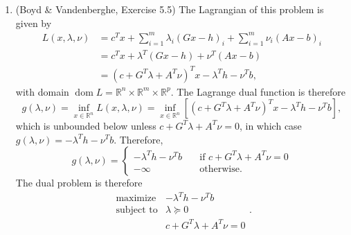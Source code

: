 \documentclass[letterpaper,12pt]{article}
\DeclareMathOperator{\dom}{dom}
\begin{document}
\begin{enumerate}
\item (Boyd \& Vandenberghe, Exercise 5.5) The Lagrangian of this
  problem is given by
  \begin{align*}
    L(x, \lambda, \nu)
      &= c^T x + \sum_{i=1}^m \lambda_i (Gx - h)_i
        + \sum_{i=1}^m \nu_i (Ax - b)_i \\
      &= c^T x + \lambda^T (Gx - h) + \nu^T (Ax - b) \\
      &= (c + G^T \lambda + A^T \nu)^T x - \lambda^T h - \nu^T b,
  \end{align*}
  with domain
  $\dom L = \mathbb{R}^n \times \mathbb{R}^m \times \mathbb{R}^p$. The
  Lagrange dual function is therefore
  \begin{equation*}
    g(\lambda, \nu) = \inf_{x \in \mathbb{R}^n} L(x, \lambda, \nu)
      = \inf_{x \in \mathbb{R}^n}
        \left[ (c + G^T \lambda + A^T \nu)^T x - \lambda^T h - \nu^T b \right],
  \end{equation*}
  which is unbounded below unless $c + G^T \lambda + A^T \nu = 0$, in
  which case $g(\lambda, \nu) = -\lambda^T h - \nu^T b$. Therefore,
  \begin{equation*}
    g(\lambda, \nu) = \begin{cases}
      -\lambda^T h - \nu^T b &\quad \text{if $c + G^T \lambda + A^T \nu = 0$} \\
      -\infty &\quad \text{otherwise}.
    \end{cases}
  \end{equation*}
  The dual problem is therefore
  \begin{equation*}
    \begin{array}{ll}
      \text{maximize} & -\lambda^T h - \nu^T b \\
      \text{subject to}
        &\lambda \succeq 0 \\
        &c + G^T \lambda + A^T \nu = 0
    \end{array}.
  \end{equation*}


\end{enumerate}
\end{document}
